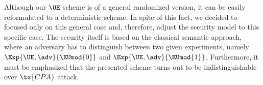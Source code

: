 \documentclass{fundam}
\begin{document}
\begin{pchstack}[center]
\begin{pcvstack}
		
		\pcvspace
		
		
		
	\end{pcvstack}
	
\end{pchstack}
\vspace{0.1cm}
Although our $\UE$ scheme is of a general randomized version, it can be easily reformulated to a deterministic scheme. In spite of this fact, we decided to focused only on this general case and, therefore, adjust the security model to this specific case. The security itself is based on the classical semantic approach, where an adversary  has to distinguish between two given experiments, namely $\Exp{\UE,\adv}{\EUmod{0}}$ and $\Exp{\UE,\adv}{\EUmod{1}}$. Furthermore, it must be emphasized that the presented scheme turns out to be indistinguishable over $\tx{CPA}$ attack.
\end{document}
